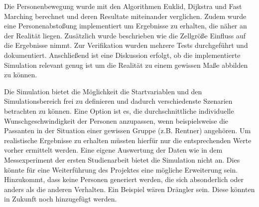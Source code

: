 Die Personenbewegung wurde mit den Algorithmen Euklid, Dijkstra und Fast Marching berechnet und deren Resultate miteinander verglichen. Zudem wurde eine Personenabstoßung implementiert um  Ergebnisse zu erhalten, die näher an der Realität liegen. Zusätzlich wurde beschrieben wie die Zellgröße Einfluss auf die Ergebnisse nimmt. Zur Verifikation wurden mehrere Tests durchgeführt und dokumentiert. Anschließend ist eine Diskussion erfolgt, ob die implementierte Simulation relevant genug ist um die Realität zu einem gewissen Maße abbilden zu können.

Die Simulation bietet die Möglichkeit die Startvariablen und den Simulationsbereich frei zu definieren und dadurch verschiedenste Szenarien betrachten zu können. Eine Option ist es, die durchschnittliche individuelle Wunschgeschwindigkeit der Personen anzupassen, wenn beispielsweise die Passanten in der Situation einer gewissen Gruppe (z.B. Rentner) angehören. Um realistische Ergebnisse zu erhalten müssten hierfür nur die entsprechenden Werte vorher ermittelt werden. Eine eigene Auswertung der Daten wie in dem Messexperiment der ersten Studienarbeit bietet die Simulation nicht an. Dies könnte für eine Weiterführung des Projektes eine mögliche Erweiterung sein. Hinzukommt, dass keine Personen generiert werden, die sich absonderlich oder anders als die anderen Verhalten. Ein Beispiel wären Drängler sein. Diese könnten in Zukunft noch hinzugefügt werden.
%




